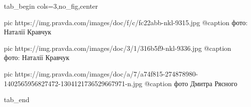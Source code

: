  
 
 
 
 


\ifcmt
  tab_begin cols=3,no_fig,center

     pic https://img.pravda.com/images/doc/f/c/fc22abb-nkl-9315.jpg
		 @caption фото: Наталії Кравчук

		 pic https://img.pravda.com/images/doc/3/1/316b5f9-nkl-9336.jpg
		 @caption фото: Наталії Кравчук

		 pic https://img.pravda.com/images/doc/a/7/a74f815-274878980-1402565956827472-1304121736529667971-n.jpg
		 @caption фото Дмитра Рясного

  tab_end
\fi
